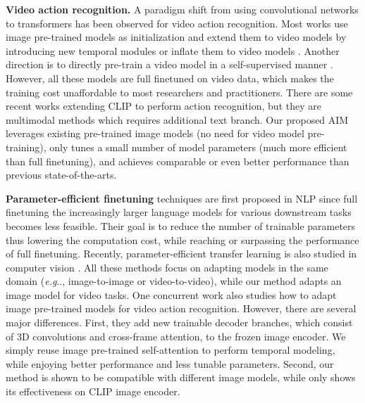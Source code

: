 \documentclass{article} \usepackage{iclr2023_conference,times}
\makeatletter
\DeclareRobustCommand\onedot{\futurelet\@let@token\@onedot}
\def\@onedot{\ifx\@let@token.\else.\null\fi\xspace}
\def\eg{\emph{e.g}\onedot} \def\Eg{\emph{E.g}\onedot}
\makeatother
\begin{document}
	\textbf{Video action recognition.} 
A paradigm shift from using convolutional networks \citep{i3d,r21d,yang2021mutualnet,lin2019tsm,feichtenhofer2019slowfast} to transformers has been observed for video action recognition. Most works use image pre-trained models as initialization and extend them to video models by introducing new temporal modules \citep{timesformer, arnab2021vivit, zhang2021vidtr, yan2022multiview} or inflate them to video models \citep{liu2022videoswin}. 
Another direction is to directly pre-train a video model in a self-supervised manner \citep{kuang2021video, feichtenhofer2022videomae, zolfaghari2021crossclr, tan2021vimpac}.
However, all these models are full finetuned on video data, which makes the training cost unaffordable to most researchers and practitioners. 
	There are some recent works \cite{xclip, promptclip} extending CLIP to perform action recognition, but they are multimodal methods which requires additional text branch. 
	Our proposed AIM leverages existing pre-trained image models (no need for video model pre-training), only tunes a small number of model parameters (much more efficient than full finetuning), and achieves comparable or even better performance than previous state-of-the-arts.
	


	




	\textbf{Parameter-efficient finetuning} techniques \citep{adapter,hu2022lora,prompttuning,li-liang-2021-prefix,unifiedadapter,ben-zaken-etal-2022-bitfit,fixsparsemask,qing2022mar} are first proposed in NLP since full finetuning the increasingly larger language models for various downstream tasks becomes less feasible. 
	Their goal is to reduce the number of trainable parameters thus lowering the computation cost, while reaching or surpassing the performance of full finetuning. 
Recently, parameter-efficient transfer learning is also studied in computer vision \citep{vpt,visualpixelprompt,chen2022adaptformer,convadapter,gao2022dept}. 
All these methods focus on adapting models in the same domain (\eg, image-to-image or video-to-video), while our method adapts an image model for video tasks. 
	One concurrent work \citep{frozenclip} also studies how to adapt image pre-trained models for video action recognition. However, there are several major differences. First, they add new trainable decoder branches, which consist of 3D convolutions and cross-frame attention, to the frozen image encoder. We simply reuse image pre-trained self-attention to perform temporal modeling, while enjoying better performance and less tunable parameters. Second, our method is shown to be compatible with different image models, while \citet{frozenclip} only shows its effectiveness on CLIP image encoder.
\end{document}
